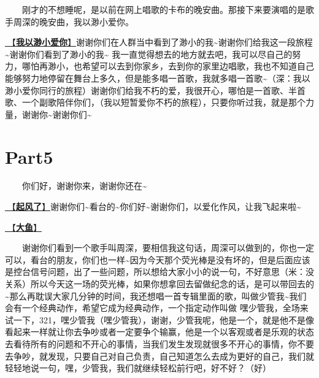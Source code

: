 \documentclass[]{ctexbook}
\begin{document}
  刚才的不想睡呢，是以前在网上唱歌的卡布的晚安曲。那接下来要演唱的是歌手周深的晚安曲，我以渺小爱你。

\hyperref[loving-you-in-my-humble-way]{🎵【\textbf{我以渺小爱你}】}谢谢你们在人群当中看到了渺小的我\textasciitilde 谢谢你们给我这一段旅程\textasciitilde 谢谢你们看到了渺小的我\textasciitilde{}
我一直觉得想去的地方就去吧，我可以尽自己的努力，哪怕再渺小，也希望可以去到你家乡，去到你的家里边唱歌，我也不知道自己能够努力地停留在舞台上多久，但是能多唱一首歌，我就多唱一首歌\textasciitilde（深：我以渺小爱你同行的旅程）谢谢你们给我不朽的爱，我很开心，哪怕是一首歌、半首歌、一个副歌陪伴你们，（我以短暂爱你不朽的旅程），只要你听过我，就是那个力量，谢谢你\textasciitilde 谢谢你们\textasciitilde{}

\section{Part5}\label{hangzhou-20240824-part5}

  你们好，谢谢你来，谢谢你还在\textasciitilde{}

\hyperref[the-wind-rises]{🎵【\textbf{起风了}】}谢谢你们\textasciitilde 看台的\textasciitilde 你们好\textasciitilde 谢谢你们，以爱化作风，让我飞起来啦\textasciitilde{}

\hyperref[big-fish]{🎵【\textbf{大鱼}】}

  谢谢你们看到一个歌手叫周深，要相信我这句话，周深可以做到的，你也一定可以，看台的朋友，你们也一样\textasciitilde 因为今天那个荧光棒是没有坏的，但是后面应该是控台信号问题，出了一些问题，所以想给大家小小的说一句，不好意思（米：没关系）所以今天这一场的荧光棒，如果你想拿回去留做纪念的话，是可以带回去的\textasciitilde 那么再耽误大家几分钟的时间，我还想唱一首专辑里面的歌，叫做少管我\textasciitilde 我们会有一个经典动作，希望它成为经典动作，一个指定动作叫做 嘿少管我，全场来试一下，321，嘿少管我（嘿少管我），谢谢，少管我呢，他是一个，就是他不是像看起来一样就让你去争吵或者一定要争个输赢，他是一个以客观或者是乐观的状态去看待所有的问题和不开心的事情，当我们发生发现就很多不开心的事情，你不要去争吵，就发现，只要自己对自己负责，自己知道怎么去成为更好的自己，我们就轻轻地说一句，嘿，少管我，我们就继续轻松前行吧，好不好？（好）
\end{document}
